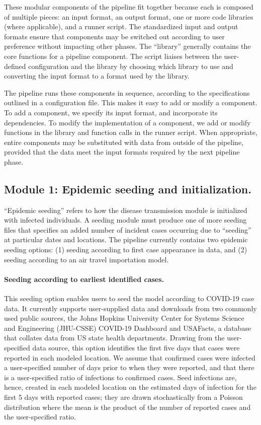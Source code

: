 These modular components of the pipeline fit together because each is composed of multiple pieces: an input format, an output format, one or more code libraries (where applicable), and a runner script. The standardized input and output formats ensure that components may be switched out according to user preference without impacting other phases. The “library” generally contains the core functions for a pipeline component. The script liaises between the user-defined configuration and the library by choosing which library to use and converting the input format to a format used by the library. 

The pipeline runs these components in sequence, according to the specifications outlined in a configuration file. This makes it easy to add or modify a component. To add a component, we specify its input format, and incorporate its dependencies. To modify the implementation of a component, we add or modify functions in the library and function calls in the runner script. When appropriate, entire components may be substituted with data from outside of the pipeline, provided that the data meet the input formats required by the next pipeline phase.

\subsection{Module 1: Epidemic seeding and initialization.} 

“Epidemic seeding” refers to how the disease transmission module is initialized with infected individuals. A seeding module must produce one of more seeding files that specifies an added number of incident cases occurring due to “seeding” at particular dates and locations. The pipeline currently contains two epidemic seeding options: (1) seeding according to first case appearance in data, and (2) seeding according to an air travel importation model. 

\paragraph{Seeding according to earliest identified cases.} This seeding option enables users to seed the model according to COVID-19 case data. It currently supports user-supplied data and downloads from two commonly used public sources, the Johns Hopkins University Center for Systems Science and Engineering (JHU-CSSE) COVID-19 Dashboard\cite{Dong:InteractiveWebbasedDashboard:2020} and USAFacts, a database that collates data from US state health departments\cite{USAFacts:USCOVID19Cases}. Drawing from the user-specified data source, this option identifies the first five days that cases were reported in each modeled location. We assume that confirmed cases were infected a user-specified number of days prior to when they were reported, and that there is a user-specified ratio of infections to confirmed cases. Seed infections are, hence, created in each modeled location on the estimated days of infection for the first 5 days with reported cases; they are drawn stochastically from a Poisson distribution where the mean is the product of the number of reported cases and the user-specified ratio. 


